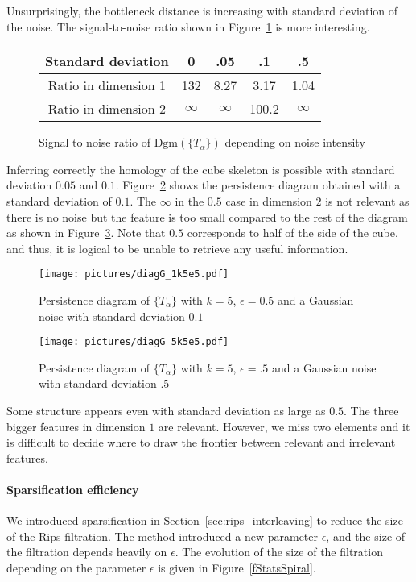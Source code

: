 \documentclass[a4paper]{article}
\newcommand\Dgm[1]{\mathrm{Dgm}(#1)}
\begin{document}
Unsurprisingly, the bottleneck distance is increasing with standard deviation of the noise.
The signal-to-noise ratio shown in Figure~\ref{fGaussRatio} is more interesting.

\begin{figure}[!ht]
\centering
\begin{tabular}{|c|c|c|c|c|}
\hline
Standard deviation & 0 & .05 & .1 & .5 \\
\hline
Ratio in dimension 1 & 132 & 8.27 & 3.17 & 1.04 \\
Ratio in dimension 2 & $\infty$ & $\infty$ & 100.2 & $\infty$ \\
\hline
\end{tabular}
\caption{Signal to noise ratio of $\Dgm{\{T_\alpha\}}$ depending on noise intensity}\label{fGaussRatio}
\end{figure}

Inferring correctly the homology of the cube skeleton is possible with standard deviation $0.05$ and $0.1$.
Figure~\ref{fPersGaus.1} shows the persistence diagram obtained with a standard deviation of $0.1$.
The $\infty$ in the $0.5$ case in dimension $2$ is not relevant as there is no noise but the feature is too small compared to the rest of the diagram as shown in Figure~\ref{fPersGaus.5}.
Note that $0.5$ corresponds to half of the side of the cube, and thus, it is logical to be unable to retrieve any useful information.

\begin{figure}[!ht]
\centering
\texttt{[image: pictures/diagG\_1k5e5.pdf]}
\caption{Persistence diagram of $\{T_\alpha\}$ with $k=5$, $\epsilon=0.5$ and a Gaussian noise with standard deviation $0.1$}\label{fPersGaus.1}
\end{figure}

\begin{figure}[!ht]
\centering
\texttt{[image: pictures/diagG\_5k5e5.pdf]}
\caption{Persistence diagram of $\{T_\alpha\}$ with $k=5$, $\epsilon=.5$ and a Gaussian noise with standard deviation $.5$}\label{fPersGaus.5}
\end{figure}

Some structure appears even with standard deviation as large as $0.5$. 
The three bigger features in dimension $1$ are relevant. 
However, we miss two elements and it is difficult to decide where to draw the frontier between relevant and irrelevant features.

\paragraph{Sparsification efficiency\\}
We introduced sparsification in Section~\ref{sec:rips_interleaving} to reduce the size of the Rips filtration.
The method introduced a new parameter $\epsilon$, and  the size of the filtration depends heavily on $\epsilon$.
The evolution of the size of the filtration depending on the parameter $\epsilon$ is given in Figure~\ref{fStatsSpiral}.
\end{document}
